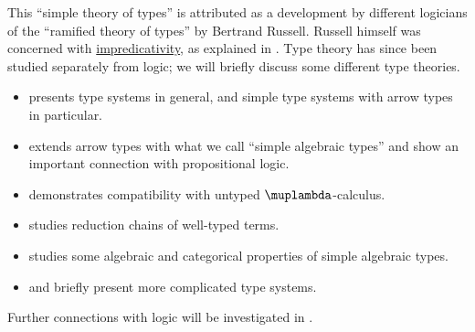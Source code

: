 This \enquote{simple theory of types} is attributed as a development by different logicians of the \enquote{ramified theory of types} by Bertrand Russell. Russell himself was concerned with \hyperref[con:impredicative_definition]{impredicativity}, as explained in . Type theory has since been studied separately from logic; we will briefly discuss some different type theories.

\begin{itemize}
  \item {} presents type systems in general, and simple type systems with arrow types in particular.
  \item {} extends arrow types with what we call \enquote{simple algebraic types} and show an important connection with propositional logic.
  \item {} demonstrates compatibility with untyped \( \muplambda \)-calculus.
  \item {} studies reduction chains of well-typed terms.
  \item {} studies some algebraic and categorical properties of simple algebraic types.
  \item {} and  briefly present more complicated type systems.
\end{itemize}

Further connections with logic will be investigated in .
